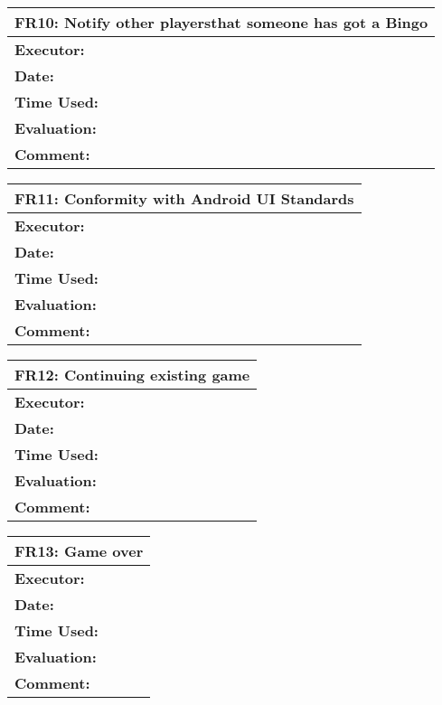 \begin{tabular}{|m{}||m{}|}
\hline
\multicolumn{2}{|l|}{FR10: Notify other playersthat someone has got a Bingo} \\ \hline
\textbf{Executor:} & \\ \hline
\textbf{Date:} & \\ \hline
\textbf{Time Used:} & \\ \hline
\textbf{Evaluation:} & \\ \hline
\textbf{Comment:} & \\ \hline
\end{tabular}

\begin{tabular}{|m{}||m{}|}
\hline
\multicolumn{2}{|l|}{FR11: Conformity with Android UI Standards} \\ \hline
\textbf{Executor:} & \\ \hline
\textbf{Date:} & \\ \hline
\textbf{Time Used:} & \\ \hline
\textbf{Evaluation:} & \\ \hline
\textbf{Comment:} & \\ \hline
\end{tabular}

\begin{tabular}{|m{}||m{}|}
\hline
\multicolumn{2}{|l|}{FR12: Continuing existing game} \\ \hline
\textbf{Executor:} & \\ \hline
\textbf{Date:} & \\ \hline
\textbf{Time Used:} & \\ \hline
\textbf{Evaluation:} & \\ \hline
\textbf{Comment:} & \\ \hline
\end{tabular}

\begin{tabular}{|m{}||m{}|}
\hline
\multicolumn{2}{|l|}{FR13: Game over} \\ \hline
\textbf{Executor:} & \\ \hline
\textbf{Date:} & \\ \hline
\textbf{Time Used:} & \\ \hline
\textbf{Evaluation:} & \\ \hline
\textbf{Comment:} & \\ \hline
\end{tabular}

